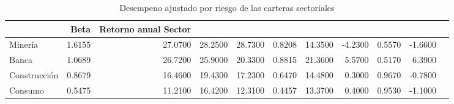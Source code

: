\begin{table}
\caption{Desempeno ajustado por riesgo de las carteras sectoriales}
\label{tab:tabla9_desempeno_ajustado}
\begin{tabular}{lrrrrrrrrr}
\toprule
 & Beta & Retorno anual %
Sector &  &  &  &  &  &  &  &  &  \\
\midrule
Minería & 1.6155 & 27.0700 & 28.2500 & 28.7300 & 0.8208 & 14.3500 & -4.2300 & 0.5570 & -1.6600 \\
Banca & 1.0689 & 26.7200 & 25.9000 & 20.3300 & 0.8815 & 21.3600 & 5.5700 & 0.5170 & 6.3900 \\
Construcción & 0.8679 & 16.4600 & 19.4300 & 17.2300 & 0.6470 & 14.4800 & 0.3000 & 0.9670 & -0.7800 \\
Consumo & 0.5475 & 11.2100 & 16.4200 & 12.3100 & 0.4457 & 13.3700 & 0.4000 & 0.9530 & -1.1000 \\
\bottomrule
\end{tabular}
\end{table}
